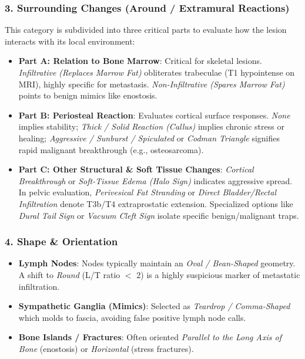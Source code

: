 \documentclass[a4paper,10pt]{article}
\begin{document}
\subsubsection{3. Surrounding Changes (Around / Extramural Reactions)}
This category is subdivided into three critical parts to evaluate how the lesion interacts with its local environment:
\begin{itemize}
    \item \textbf{Part A: Relation to Bone Marrow}: Critical for skeletal lesions. \textit{Infiltrative (Replaces Marrow Fat)} obliterates trabeculae (T1 hypointense on MRI), highly specific for metastasis. \textit{Non-Infiltrative (Spares Marrow Fat)} points to benign mimics like enostosis.
    \item \textbf{Part B: Periosteal Reaction}: Evaluates cortical surface responses. \textit{None} implies stability; \textit{Thick / Solid Reaction (Callus)} implies chronic stress or healing; \textit{Aggressive / Sunburst / Spiculated} or \textit{Codman Triangle} signifies rapid malignant breakthrough (e.g., osteosarcoma).
    \item \textbf{Part C: Other Structural \& Soft Tissue Changes}: \textit{Cortical Breakthrough} or \textit{Soft-Tissue Edema (Halo Sign)} indicates aggressive spread. In pelvic evaluation, \textit{Perivesical Fat Stranding} or \textit{Direct Bladder/Rectal Infiltration} denote T3b/T4 extraprostatic extension. Specialized options like \textit{Dural Tail Sign} or \textit{Vacuum Cleft Sign} isolate specific benign/malignant traps.
\end{itemize}

\subsubsection{4. Shape \& Orientation}
\begin{itemize}
    \item \textbf{Lymph Nodes}: Nodes typically maintain an \textit{Oval / Bean-Shaped} geometry. A shift to \textit{Round} (L/T ratio $<$ 2) is a highly suspicious marker of metastatic infiltration.
    \item \textbf{Sympathetic Ganglia (Mimics)}: Selected as \textit{Teardrop / Comma-Shaped} which molds to fascia, avoiding false positive lymph node calls.
    \item \textbf{Bone Islands / Fractures}: Often oriented \textit{Parallel to the Long Axis of Bone} (enostosis) or \textit{Horizontal} (stress fractures).
\end{itemize}
\end{document}
